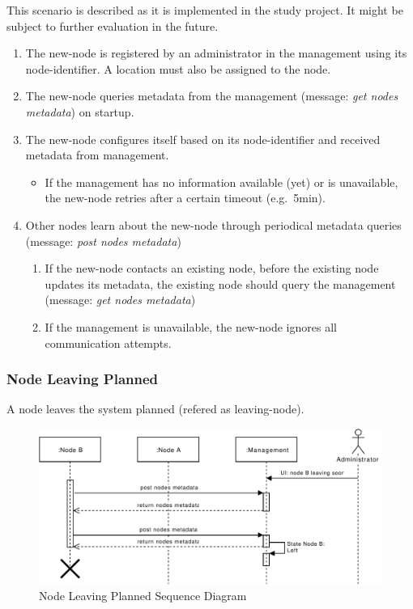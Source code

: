 This scenario is described as it is implemented in the study project. It might be subject to further evaluation in the future.

\begin{enumerate}
    \item The \gls{new-node} is registered by an \gls{administrator} in the \gls{management} using its \gls{node-identifier}. A \gls{location} must also be assigned to the \gls{node}. %
    \item The \gls{new-node} queries \gls{metadata} from the \gls{management} (message: \emph{get nodes metadata}) on startup.
    \item The \gls{new-node} configures itself based on its \gls{node-identifier} and received \gls{metadata} from \gls{management}.
        \begin{itemize}
            \item If the \gls{management} has no information available (yet) or is unavailable, the \gls{new-node} retries after a certain timeout (e.g.\ 5min).
        \end{itemize}
    \item Other \glspl{node} learn about the \gls{new-node} through periodical \gls{metadata} queries (message: \emph{post nodes metadata})
        \begin{enumerate}
            \item If the \gls{new-node} contacts an existing \gls{node}, before the existing \gls{node} updates its \gls{metadata}, the existing \gls{node} should query the \gls{management} (message: \emph{get nodes metadata})
            \item If the \gls{management} is unavailable, the \gls{new-node} ignores all communication attempts.
        \end{enumerate}
\end{enumerate}

\subsubsection{Node Leaving Planned}\label{sec:scenario-node-leave-planned}
A \gls{node} leaves the \gls{system} planned (refered as \gls{leaving-node}).

\begin{figure}[h]
    \centering
    \includegraphics[width=\linewidth]{resources/node_leaving_planned.pdf}
    \caption{Node Leaving Planned Sequence Diagram}
    \label{fig:node-leave-planned}
\end{figure}

